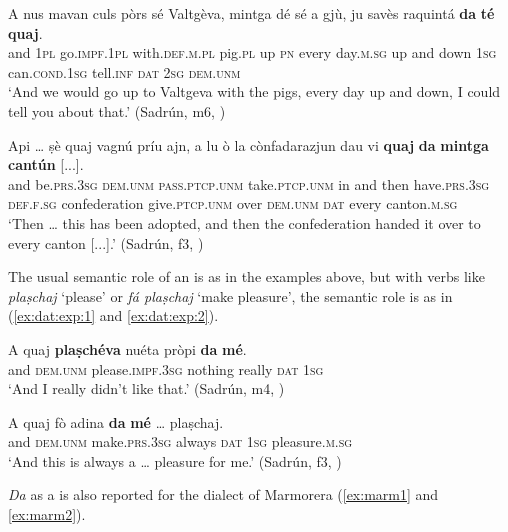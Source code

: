 \ea
\label{ex:io:3}
\gll    A nus mavan culs pòrs sé Valtgèva, mintga dé sé a gjù, ju savès raquintá {\ob}\textbf{da} \textbf{té}{\cb} {\ob}\textbf{quaj}{\cb}.\\
and \textsc{1pl}  go.\textsc{impf.1pl} with.\textsc{def.m.pl} pig.\textsc{pl} up \textsc{pn} every day.\textsc{m.sg} up and down  \textsc{1sg}  can.\textsc{cond.1sg}  tell.\textsc{inf}  \textsc{dat}  \textsc{2sg} \textsc{dem.unm}\\
\glt `And we would go up to Valtgeva with the pigs, every day up and down, I could tell you about that.' (Sadrún, m6, )
\z

\ea\label{ex:io:1}
\gll Api … ṣè quaj vagnú príu ajn, a lu ò la cònfadarazjun dau vi {\ob}\textbf{quaj}{\cb} {\ob}\textbf{da} \textbf{mintga} \textbf{cantún}{\cb} [...].   \\
and {} be.\textsc{prs.3sg} \textsc{dem.unm} \textsc{pass.ptcp.unm} take.\textsc{ptcp.unm} in and then have.\textsc{prs.3sg} \textsc{def.f.sg} confederation give.\textsc{ptcp.unm} over \textsc{dem.unm} \textsc{dat} every canton.\textsc{m.sg}\\
\glt `Then … this has been adopted, and then the confederation handed it over to every canton [...].' (Sadrún, f3, )
\z

The usual semantic role of an  is  as in the examples above, but with verbs like \textit{plaṣchaj} `please' or \textit{fá plaṣchaj} `make pleasure', the semantic role is   as in (\ref{ex:dat:exp:1} and \ref{ex:dat:exp:2}).

\ea\label{ex:dat:exp:1}
\gll A quaj \textbf{plaṣchéva} nuéta pròpi \textbf{da} \textbf{mé}. \\
and \textsc{dem.unm} please.\textsc{impf.3sg} nothing really \textsc{dat} \textsc{1sg}   \\
\glt `And I really didn’t like that.' (Sadrún, m4, )
\z

\ea
\label{ex:dat:exp:2}
\gll  A quaj fò adina \textbf{da} \textbf{mé} … plaṣchaj.  \\
and \textsc{dem.unm} make.\textsc{prs.3sg} always \textsc{dat} \textsc{1sg} {} pleasure.\textsc{m.sg} \\
\glt `And this is always a … pleasure for me.' (Sadrún, f3, )
\z

\textit{Da} as a  is also reported for the  dialect of Marmorera (\ref{ex:marm1} and \ref{ex:marm2}).


